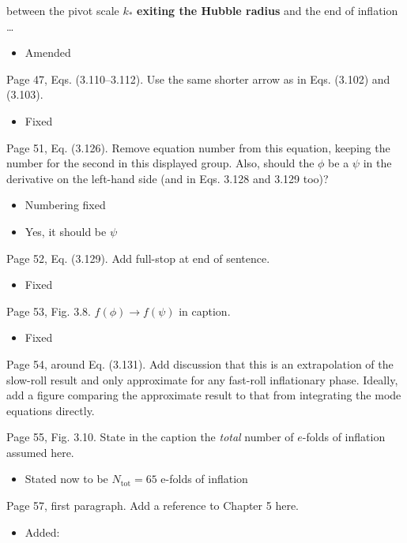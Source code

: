\documentclass[11pt]{article}
\newcommand{\todo}[1]{{\color{red} #1}}
\begin{document}
\begin{enumerate}
  between the pivot scale $k_\ast$ \textbf{exiting the Hubble radius}
  and the end of inflation \ldots
  \begin{itemize}
    \item Amended
  \end{itemize}
\item Page 47, Eqs. (3.110--3.112). Use the same shorter arrow as in
  Eqs. (3.102) and (3.103).
  \begin{itemize}
    \item Fixed
  \end{itemize}
\item Page 51, Eq. (3.126). Remove equation number from this equation,
  keeping the number for the second in this displayed group. Also,
  should the $\phi$ be a $\psi$ in the derivative on the left-hand
  side (and in Eqs. 3.128 and 3.129 too)?
  \begin{itemize}
    \item Numbering fixed
    \item Yes, it should be $\psi$
  \end{itemize}
\item Page 52, Eq. (3.129). Add full-stop at end of sentence.
  \begin{itemize}
    \item Fixed
  \end{itemize}
\item Page 53, Fig. 3.8. $f(\phi) \rightarrow f(\psi)$ in caption.
  \begin{itemize}
    \item Fixed
  \end{itemize}
  \todo{
\item Page 54, around Eq. (3.131). Add discussion that this is an
  extrapolation of the slow-roll result and only approximate for any
  fast-roll inflationary phase. Ideally, add a figure comparing the
  approximate result to that from integrating the mode equations directly.
}
\item Page 55, Fig. 3.10. State in the caption the \emph{total} number
  of $e$-folds of inflation assumed here.
  \begin{itemize}
    \item Stated now to be $N_\mathrm{tot}=65$ e-folds of inflation
  \end{itemize}
\item Page 57, first paragraph. Add a reference to Chapter 5 here.
  \begin{itemize}
    \item Added:

\end{itemize}
\end{enumerate}
\end{document}
